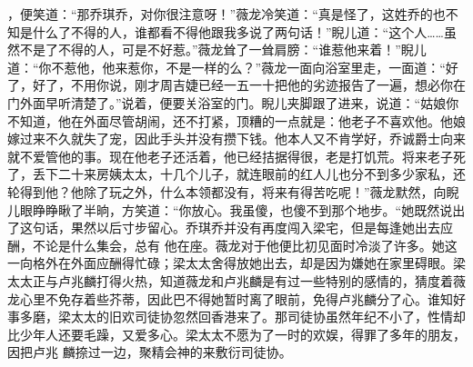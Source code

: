 \documentclass{article}
\begin{document}
\newpage
，便笑道：“那乔琪乔，对你很注意呀！”薇龙冷笑道：“真是怪了，这姓乔的也不知是什么了不得的人，谁都看不得他跟我多说了两句话！”睨儿道：“这个人……虽然不是了不得的人，可是不好惹。”薇龙耸了一耸肩膀：“谁惹他来着！”睨儿道：“你不惹他，他来惹你，不是一样的么？”薇龙一面向浴室里走，一面道：“好了，好了，不用你说，刚才周吉婕已经一五一十把他的劣迹报告了一遍，想必你在门外面早听清楚了。”说着，便要关浴室的门。睨儿夹脚跟了进来，说道：“姑娘你不知道，他在外面尽管胡闹，还不打紧，顶糟的一点就是：他老子不喜欢他。他娘嫁过来不久就失了宠，因此手头并没有攒下钱。他本人又不肯学好，乔诚爵士向来就不爱管他的事。现在他老子还活着，他已经拮据得很，老是打饥荒。将来老子死了，丢下二十来房姨太太，十几个儿子，就连眼前的红人儿也分不到多少家私，还轮得到他？他除了玩之外，什么本领都没有，将来有得苦吃呢！”薇龙默然，向睨儿眼睁睁瞅了半晌，方笑道：“你放心。我虽傻，也傻不到那个地步。“她既然说出了这句话，果然以后寸步留心。乔琪乔并没有再度闯入梁宅，但是每逢她出去应酬，不论是什么集会，总有
\newpage
他在座。薇龙对于他便比初见面时冷淡了许多。她这一向格外在外面应酬得忙碌；梁太太舍得放她出去，却是因为嫌她在家里碍眼。梁太太正与卢兆麟打得火热，知道薇龙和卢兆麟是有过一些特别的感情的，猜度着薇龙心里不免存着些芥蒂，因此巴不得她暂时离了眼前，免得卢兆麟分了心。谁知好事多磨，梁太太的旧欢司徒协忽然回香港来了。那司徒协虽然年纪不小了，性情却比少年人还要毛躁，又爱多心。梁太太不愿为了一时的欢娱，得罪了多年的朋友，因把卢兆
麟捺过一边，聚精会神的来敷衍司徒协。 
\end{document}
